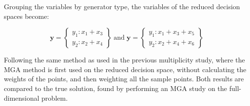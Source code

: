 Grouping the variables by generator type, the variables of the reduced decision spaces become:

\begin{equation*}
\mathbf{y} = 
\begin{Bmatrix}
y_1: x_1 + x_3 \\
y_2: x_2 + x_4
\end{Bmatrix}
\; \text{and} \;
\mathbf{y} = 
\begin{Bmatrix}
y_1: x_1 + x_3 + x_5 \\
y_2: x_2 + x_4 + x_6
\end{Bmatrix}
\end{equation*}

Following the same method as used in the previous multiplicity study, where the MGA method is first used on the reduced decision space, without calculating the weights of the points, and then weighting all the sample points. Both results are compared to the true solution, found by performing an MGA study on the full-dimensional problem. 

